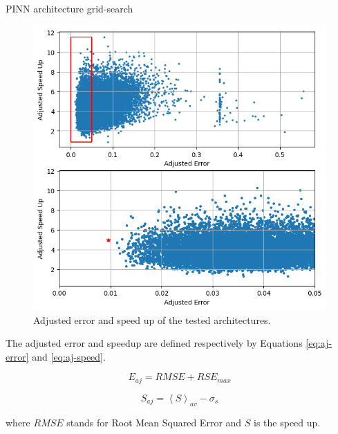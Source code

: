 \documentclass[serif,8pt, aspectratio=169]{beamer}
\begin{document}
    \begin{frame}[fragile]{PINN architecture grid-search}
        \begin{minipage}{0.55\linewidth}
            \begin{figure}
                \centering
                \includegraphics[width=0.85\linewidth]{pic/pinn_selection.png}
                \caption{Adjusted error and speed up of the tested architectures.}
                \label{fig:pinn-selection}
            \end{figure}
        \end{minipage}
        \begin{minipage}{0.4\linewidth}
            The adjusted error and speedup are defined respectively by Equations \ref{eq:aj-error} and \ref{eq:aj-speed}.
    
            \begin{equation}\label{eq:aj-error}
                E_{aj} = RMSE + RSE_{max}
            \end{equation}
    
            \begin{equation}\label{eq:aj-speed}
                S_{aj} = \left< S \right>_{av} - \sigma_s
            \end{equation}
    
            where $RMSE$ stands for Root Mean Squared Error and $S$ is the speed up.
        \end{minipage}
    \end{frame}
    
\end{document}
